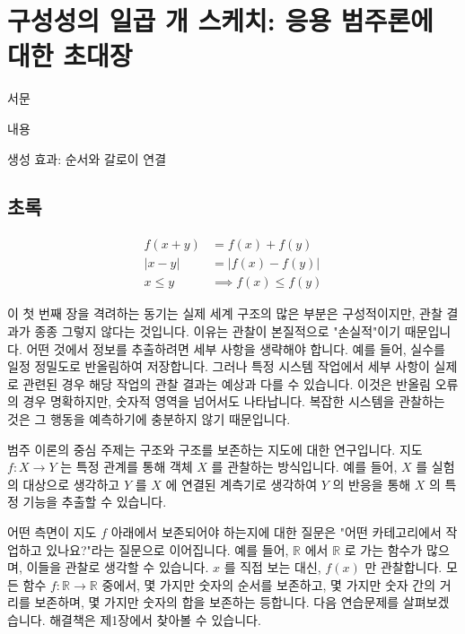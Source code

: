 \documentclass[11pt, a4paper, twoside, openany]{book}
\begin{document}
\tableofcontents
\clearpage


\chapter{구성성의 일곱 개 스케치: 응용 범주론에 대한 초대장}
\label{ch:1}
\vspace{12pt}

서문

\par\medskip
내용

\par\medskip
생성 효과: 순서와 갈로이 연결


\section{초록}
\label{sec:1-1}

$$
\begin{aligned}
f(x+y) &= f(x)+f(y) \\
|x-y| &= |f(x)-f(y)| \\
x \leq y &\implies f(x) \leq f(y)
\end{aligned}
$$

\par\medskip
이 첫 번째 장을 격려하는 동기는 실제 세계 구조의 많은 부분은 구성적이지만, 관찰 결과가 종종 그렇지 않다는 것입니다. 이유는 관찰이 본질적으로 "손실적"이기 때문입니다. 어떤 것에서 정보를 추출하려면 세부 사항을 생략해야 합니다. 예를 들어, 실수를 일정 정밀도로 반올림하여 저장합니다. 그러나 특정 시스템 작업에서 세부 사항이 실제로 관련된 경우 해당 작업의 관찰 결과는 예상과 다를 수 있습니다. 이것은 반올림 오류의 경우 명확하지만, 숫자적 영역을 넘어서도 나타납니다. 복잡한 시스템을 관찰하는 것은 그 행동을 예측하기에 충분하지 않기 때문입니다.

\par\medskip
범주 이론의 중심 주제는 구조와 구조를 보존하는 지도에 대한 연구입니다. 지도 $f: X \rightarrow Y$ 는 특정 관계를 통해 객체 $X$ 를 관찰하는 방식입니다. 예를 들어, $X$ 를 실험의 대상으로 생각하고 $Y$ 를 $X$ 에 연결된 계측기로 생각하여 $Y$ 의 반응을 통해 $X$ 의 특정 기능을 추출할 수 있습니다.

\par\medskip
어떤 측면이 지도 $f$ 아래에서 보존되어야 하는지에 대한 질문은 "어떤 카테고리에서 작업하고 있나요?"라는 질문으로 이어집니다. 예를 들어, $\mathbb{R}$ 에서 $\mathbb{R}$ 로 가는 함수가 많으며, 이들을 관찰로 생각할 수 있습니다. $x$ 를 직접 보는 대신, $f(x)$ 만 관찰합니다. 모든 함수 $f: \mathbb{R} \rightarrow \mathbb{R}$ 중에서, 몇 가지만 숫자의 순서를 보존하고, 몇 가지만 숫자 간의 거리를 보존하며, 몇 가지만 숫자의 합을 보존하는 등합니다. 다음 연습문제를 살펴보겠습니다. 해결책은 제\hspace{0pt}1\hspace{0pt}장에서 찾아볼 수 있습니다.
\end{document}
